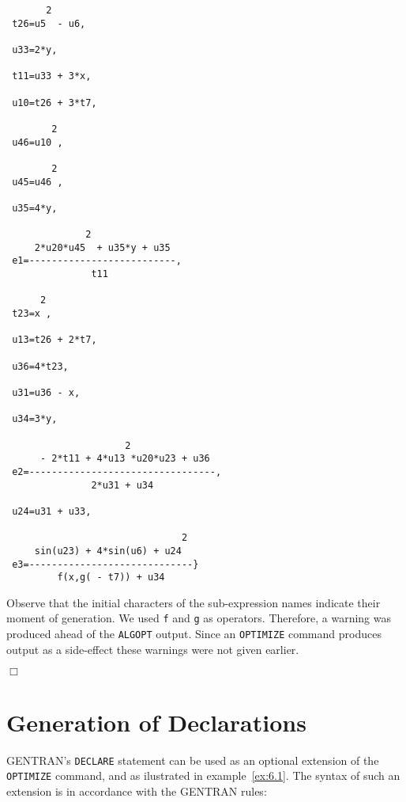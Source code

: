 \newpage
{\small
\begin{verbatim}
       2
 t26=u5  - u6,

 u33=2*y,

 t11=u33 + 3*x,

 u10=t26 + 3*t7,

        2
 u46=u10 ,

        2
 u45=u46 ,

 u35=4*y,

              2
     2*u20*u45  + u35*y + u35
 e1=--------------------------,
               t11

      2
 t23=x ,

 u13=t26 + 2*t7,

 u36=4*t23,

 u31=u36 - x,

 u34=3*y,

                     2
      - 2*t11 + 4*u13 *u20*u23 + u36
 e2=---------------------------------,
               2*u31 + u34

 u24=u31 + u33,

                               2
     sin(u23) + 4*sin(u6) + u24
 e3=-----------------------------}
         f(x,g( - t7)) + u34
\end{verbatim}}
\noindent
Observe that the initial characters of the sub-expression names indicate
their moment of generation. We used {\tt f} and {\tt g} as operators. 
Therefore, a warning was produced ahead of the {\tt ALGOPT} output.
Since an {\tt OPTIMIZE} command produces output as a side-effect these warnings
were not given earlier.
{\small
\begin{flushright}
$\Box$
\end{flushright}}
\newpage
\section{Generation of Declarations}\label{SCOPE:decl}

GENTRAN's {\tt DECLARE} statement can be used as an optional extension of the
{\tt OPTIMIZE} command, and as ilustrated in example~\ref{ex:6.1}. The syntax 
of such an extension is in accordance with the GENTRAN rules:

